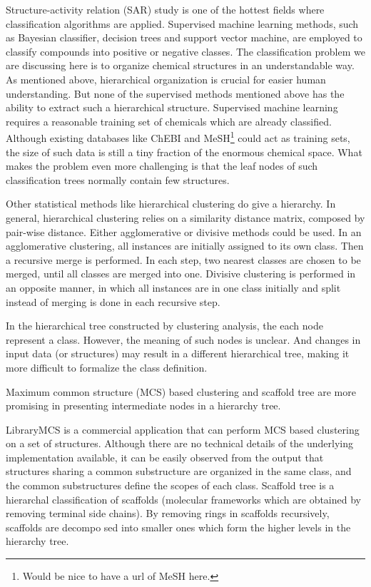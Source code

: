 \documentclass[10pt]{bmc_article}
\newenvironment{bmcformat}{\baselineskip20pt\sloppy\setboolean{publ}{false}}{\baselineskip20pt\sloppy}
\begin{document}
\begin{bmcformat}
Structure-activity relation (SAR) study is one of the hottest fields where classification algorithms are applied. Supervised machine learning methods, such as Bayesian classifier, decision trees and support vector machine,  are employed to classify compounds into positive or negative classes. The classification problem we are discussing here is to organize chemical structures in an understandable way. As mentioned above, hierarchical organization is crucial for easier human understanding. But none of the supervised methods mentioned above has the ability to extract such a hierarchical structure. Supervised machine learning requires a reasonable training set of chemicals which are already classified. Although existing databases like ChEBI and MeSH\footnote{Would be nice to have a url of MeSH here.} could act as training sets, the size of such data is still a tiny fraction of the enormous chemical space. What makes the problem even more challenging is that the leaf nodes of such classification trees normally contain few structures. 

Other statistical methods like hierarchical clustering\cite{Adamson1981} do give a hierarchy. In general, hierarchical clustering relies on a similarity distance matrix, composed by pair-wise distance. Either agglomerative or divisive methods could be used. In an agglomerative clustering, all instances are initially assigned to its own class. Then a recursive merge is performed. In each step, two nearest classes are chosen to be merged, until all classes are merged into one. Divisive clustering is performed in an opposite manner, in which all instances are in one class initially and split instead of merging is done in each recursive step.

In the hierarchical tree constructed by clustering analysis, the each node represent a class. However, the meaning of such nodes is unclear. And changes in input data (or structures) may result in a different hierarchical tree, making it more difficult to formalize the class definition. 

Maximum common structure (MCS) based clustering and scaffold tree are more promising in presenting intermediate nodes in a hierarchy tree. 

LibraryMCS\cite{librarymcs} is a commercial application that can perform MCS based clustering on a set of structures. Although there are no technical details of the underlying implementation available, it can be easily observed from the output that structures sharing a common substructure are organized in the same class, and the common substructures define the scopes of each class. Scaffold tree\cite{Schuffenhauer2007} is a hierarchal classification of scaffolds (molecular frameworks which are obtained by removing terminal side chains). By removing rings in scaffolds recursively, scaffolds are decompo sed into smaller ones which form the higher levels in the hierarchy tree. 


\end{bmcformat}
\end{document}
